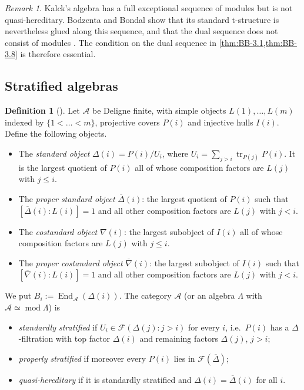 \documentclass[11pt,reqno]{amsart}
\theoremstyle{plain}
\theoremstyle{definition}
\newtheorem{definition}[theorem]{Definition}
\theoremstyle{remark}
\newtheorem{remark}[theorem]{Remark}
\DeclareMathOperator{\End}{End}
\DeclareMathOperator{\tr}{tr}
\newcommand{\modd}{\operatorname{mod}}
\newcommand{\nablabar}{\overline{\nabla}}
\newcommand{\Deltabar}{\overline{\Delta}}
\newcommand{\cA}{\mathcal{A}}
\newcommand{\cF}{\mathcal{F}}
\begin{document}
\begin{remark}
Kalck's algebra \cite[Prop.~5.6]{Kal17} has a full exceptional sequence of modules but is not quasi-hereditary. Bodzenta and Bondal show that its standard t-structure is nevertheless glued along this sequence, and that the dual sequence does not consist of modules \cite[\S4.1]{BB26}. The condition on the dual sequence in \cref{thm:BB-3.1,thm:BB-3.8} is therefore essential.
\end{remark}

\subsection{Stratified algebras}

\begin{definition}[{\cite{CPS96,Dla96,AHLU00}}]\label{def:strat}
Let $\cA$ be Deligne finite, with simple objects $L(1),\dots,L(m)$ indexed by $\{1<\dots<m\}$, projective covers $P(i)$ and injective hulls $I(i)$. Define the following objects.
\begin{itemize}
\item The \emph{standard object} $\Delta(i)=P(i)/U_i$, where $U_i=\sum_{j>i}\tr_{P(j)}P(i)$. It is the largest quotient of $P(i)$ all of whose composition factors are $L(j)$ with $j\le i$.
\item The \emph{proper standard object} $\Deltabar(i)$: the largest quotient of $P(i)$ such that $[\Deltabar(i):L(i)]=1$ and all other composition factors are $L(j)$ with $j<i$.
\item The \emph{costandard object} $\nabla(i)$: the largest subobject of $I(i)$ all of whose composition factors are $L(j)$ with $j\le i$.
\item The \emph{proper costandard object} $\nablabar(i)$: the largest subobject of $I(i)$ such that $[\nablabar(i):L(i)]=1$ and all other composition factors are $L(j)$ with $j<i$.
\end{itemize}
We put $B_i:=\End_\cA(\Delta(i))$. The category $\cA$ (or an algebra $\Lambda$ with $\cA\simeq\modd\Lambda$) is
\begin{itemize}
\item \emph{standardly stratified} if $U_i\in\cF(\Delta(j):j>i)$ for every $i$, i.e.\ $P(i)$ has a $\Delta$-filtration with top factor $\Delta(i)$ and remaining factors $\Delta(j)$, $j>i$;
\item \emph{properly stratified} if moreover every $P(i)$ lies in $\cF(\Deltabar)$;
\item \emph{quasi-hereditary} if it is standardly stratified and $\Delta(i)=\Deltabar(i)$ for all $i$.
\end{itemize}
\end{definition}
\end{document}
